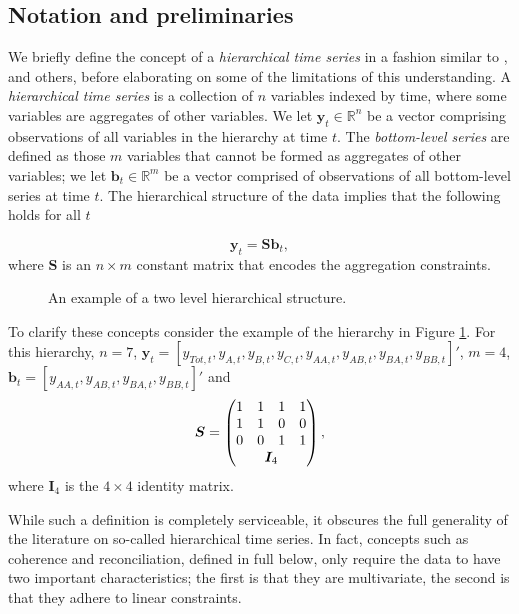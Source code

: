 \documentclass[12pt]{article}
\theoremstyle{definition}
\theoremstyle{property}
\begin{document}
	\subsection{Notation and preliminaries}\label{sec:notation}
	
    We briefly define the concept of a \emph{hierarchical time series} in a fashion similar to \cite{AthEtAl2019_MacroBook}, \cite{FPP2018} and others, before elaborating on some of the limitations of this understanding.  A \emph{hierarchical time series} is a collection of $n$ variables indexed by time, where some variables are aggregates of other variables. We let $\bm{y}_t \in \mathbb{R}^n$ be a vector comprising observations of all variables in the hierarchy at time $t$. The \emph{bottom-level series} are defined as those $m$ variables that cannot be formed as aggregates of other variables; we let $\bm{b}_t \in \mathbb{R}^m$ be a vector comprised of observations of all bottom-level series at time $t$.  The hierarchical structure of the data implies that the following holds for all $t$

    \begin{equation}
    \bm{y}_t = \bm{Sb}_t,
    \end{equation}
    where $\bm{S}$ is an $n \times m$ constant matrix that encodes the aggregation constraints.
	
		\begin{figure}[H]
			\begin{center}
				 
				 
				\qobitree
			\end{center}
			\caption{An example of a two level hierarchical structure.}\label{fig:basichier}
		\end{figure}
	
	To clarify these concepts consider the example of the hierarchy in Figure \ref{fig:basichier}.  For this hierarchy, $n=7$, $\bm{y}_t = [y_{Tot,t},y_{A,t}, y_{B,t},y_{C,t},y_{AA,t}, y_{AB,t}, y_{BA,t}, y_{BB,t}]'$, $m=4$, $\bm{b}_t = [y_{AA,t}, y_{AB,t}, y_{BA,t}, y_{BB,t}]'$ and
	\[
	\bm{S} = \begin{pmatrix}
	1 & 1 & 1 & 1  \\
	1 & 1 & 0 & 0 \\
	0 & 0 & 1 & 1 \\
	& \multicolumn{2}{c}{\bm{I}_4} &
	\end{pmatrix},
	\]
	where $\bm{I}_4$ is the $4\times 4$ identity matrix.
	
	While such a definition is completely serviceable, it obscures the full generality of the literature on so-called hierarchical time series.  In fact, concepts such as coherence and reconciliation, defined in full below, only require the data to have two important characteristics; the first is that they are multivariate, the second is that they adhere to linear constraints.
	
\end{document}
